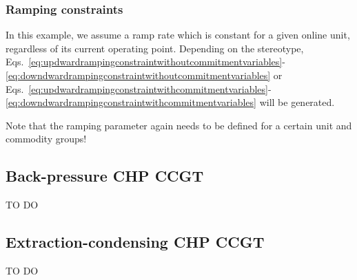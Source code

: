 \subsubsection{Ramping constraints}
In this example, we assume a ramp rate which is constant for a given online unit, regardless of its current operating point. Depending on the stereotype, Eqs.~\eqref{eq:updwardrampingconstraintwithoutcommitmentvariables}-\eqref{eq:downdwardrampingconstraintwithoutcommitmentvariables} or Eqs.~\eqref{eq:updwardrampingconstraintwithcommitmentvariables}-\eqref{eq:downdwardrampingconstraintwithcommitmentvariables} will be generated.

Note that the ramping parameter again needs to be defined for a certain unit and commodity groups!




\subsection{Back-pressure CHP CCGT}
TO DO



\subsection{Extraction-condensing CHP CCGT}
TO DO